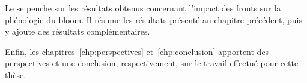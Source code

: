 Le  se penche sur les résultats obtenus concernant l'impact des fronts sur la phénologie du bloom.
Il résume les résultats présenté au chapitre précédent, puis y ajoute des résultats complémentaires.

Enfin, les chapitres~\ref{chp:perspectives} et~\ref{chp:conclusion} apportent des perspectives et une conclusion, respectivement, sur le travail effectué pour cette thèse.
